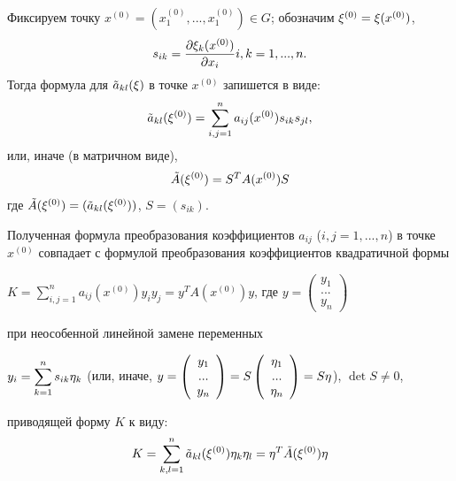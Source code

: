 Фиксируем точку $x^{(0)} =(x_{1}^{(0)} ,...,x_{1}^{(0)} )\in G$; обозначим ${\rm \xi }^{(0)} ={\rm \xi }(x^{(0)} )$,
\[s_{ik} =\frac{\partial {\rm \xi }_{k} (x^{(0)} )}{\partial x_{i} }    i,k=1,...,n.\]
Тогда формула для $\tilde{a}_{kl} ({\rm \xi })$ в точке $x^{(0)} $ запишется в виде:
\[\tilde{a}_{kl} ({\rm \xi }^{(0)} )=\sum _{i,j=1}^{n}a_{ij} (x^{(0)} )s_{ik} s_{jl}  ,\]
или, иначе (в матричном виде),
\[\tilde{A}({\rm \xi }^{(0)} )=S^{T} A(x^{(0)} )S\]
где $\tilde{A}({\rm \xi }^{(0)} )=(\tilde{a}_{kl} ({\rm \xi }^{(0)} ))$, $S=(s_{ik} )$.

Полученная формула преобразования коэффициентов $a_{ij} $ ($i,j=1,...,n$) в точке $x^{(0)} $ совпадает с формулой преобразования коэффициентов квадратичной формы

\noindent $\displaystyle K=\sum _{i,j=1}^{n}a_{ij} (x^{(0)} )y_{i} y_{j}  =y^{T} A(x^{(0)} )y$,   где    $\displaystyle y=\left(\begin{array}{c} {y_{1} } \\ {...} \\ {y_{n} } \end{array}\right)$

\noindent при неособенной линейной замене переменных

\noindent $\displaystyle y_{i} =\sum _{k=1}^{n}s_{ik} {\rm \eta }_{k}  $   (или, иначе, $y=\left(\begin{array}{c} {y_{1} } \\ {...} \\ {y_{n} } \end{array}\right)=S\left(\begin{array}{c} {{\rm \eta }_{1} } \\ {...} \\ {{\rm \eta }_{n} } \end{array}\right)=S{\rm \eta }$),   $\det S\ne 0$,

\noindent приводящей форму $K$ к виду:
\[K=\sum _{k,l=1}^{n}\tilde{a}_{kl} ({\rm \xi }^{(0)} ){\rm \eta }_{k} {\rm \eta }_{l}  ={\rm \eta }^{T} \tilde{A}({\rm \xi }^{(0)} ){\rm \eta }\]
